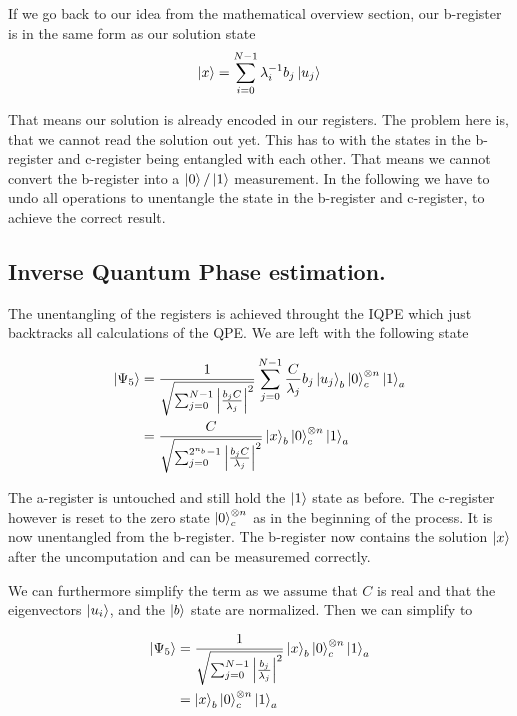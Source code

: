 If we go back to our idea from the mathematical overview section, our b-register is in the same form as our solution state
\begin{equation}
\ket{x} = \sum_{i=0}^{N-1} \lambda_i^{-1} b_j\ket{u_j}\\
\end{equation}

That means our solution is already encoded in our registers. 
The problem here is, that we cannot read the solution out yet.
This has to with the states in the b-register and c-register being entangled with each other. 
That means we cannot convert the b-register into a $\ket0 / \ket 1$ measurement.
In the following we have to undo all operations to unentangle the state in the b-register and c-register, to achieve the correct result.

\subsection{Inverse Quantum Phase estimation.}
The unentangling of the registers is achieved throught the IQPE which just backtracks all calculations of the QPE.
We are left with the following state

\begin{equation}
\begin{split}
\ket{\Psi_5} &= \frac {1} {\sqrt{\sum_{j=0}^{N-1} \left| \frac{b_jC} {\lambda_j}\right|^2}}
\sum_{j=0}^{N-1}\frac{ C}{\lambda_j}   b_j \ket{u_j}_b \ket{0}_c^{\otimes n} \ket{1}_a\\
&= \frac {C} {\sqrt{\sum_{j=0}^{2^{n_b}-1} \left| \frac{b_jC} {\lambda_j}\right|^2}}
\ket{x}_b \ket{0}^{\otimes n}_c \ket{1}_a
\end{split}
\end{equation}

The a-register is untouched and still hold the $\ket 1$ state as before. 
The c-register however is reset to the zero state $\ket{0}^{\otimes n}_c$ as in the beginning of the process. 
It is now unentangled from the b-register.
The b-register now contains the solution $\ket x$ after the uncomputation and can be measuremed correctly.

We can furthermore simplify the term as we assume that  $C$ is real and that the eigenvectors $\ket{u_i}$, and the $\ket b$ state are normalized.
Then we can simplify to 

\begin{equation}
\begin{split}
\ket{\Psi_5} &= \frac {1} {\sqrt{\sum_{j=0}^{N-1} \left| \frac{b_j} {\lambda_j}\right|^2}}
\ket{x}_b \ket{0}^{\otimes n}_c \ket{1}_a\\
&= \ket{x}_b \ket{0}^{\otimes n}_c \ket{1}_a
\end{split}
\end{equation}

